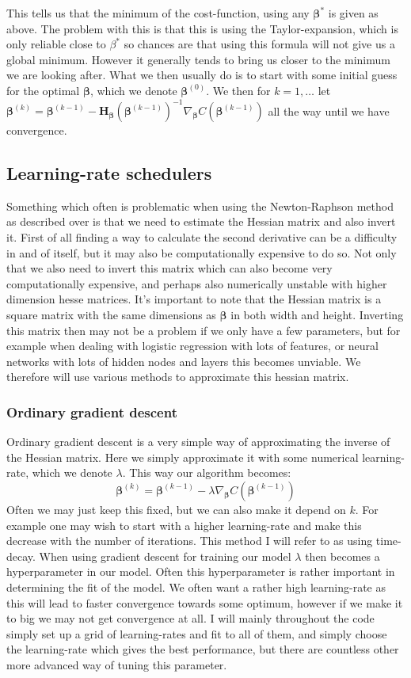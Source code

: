 \documentclass{article}
\begin{document}
This tells us that the minimum of the cost-function, using any $\bm{\beta}^*$ is
given as above. The problem with this is that this is using the
Taylor-expansion, which is only reliable close to $\beta^*$ so chances are that
using this formula will not give us a global minimum. However it generally tends
to bring us closer to the minimum we are looking after. What we then usually do
is to start with some initial guess for the optimal $\bm{\beta}$, which we
denote $\bm{\beta}^{(0)}$. We then for $k=1, \dots$ let $\bm{\beta}^{(k)} =
    \bm{\beta}^{(k-1)} - \bm{H}_{\bm{\beta}}(\bm{\beta}^{(k-1)})^{-1}
    \nabla_{\bm{\beta}} C(\bm{\beta}^{(k-1)})$ all the way until we have convergence.

\subsection{Learning-rate schedulers}
Something which often is problematic when using the Newton-Raphson method as
described over is that we need to estimate the Hessian matrix and also invert
it. First of all finding a way to calculate the second derivative can be a
difficulty in and of itself, but it may also be computationally expensive to do
so. Not only that we also need to invert this matrix which can also become very
computationally expensive, and perhaps also numerically unstable with higher
dimension hesse matrices. It's important to note that the Hessian matrix is a
square matrix with the same dimensions as $\bm{\beta}$ in both width and height.
Inverting this matrix then may not be a problem if we only have a few
parameters, but for example when dealing with logistic regression with lots of
features, or neural networks with lots of hidden nodes and layers this becomes
unviable. We therefore will use various methods to approximate this hessian matrix.

\subsubsection{Ordinary gradient descent}
Ordinary gradient descent is a very simple way of approximating the inverse of
the Hessian matrix. Here we simply approximate it with some numerical
learning-rate, which we denote $\lambda$. This way our algorithm becomes:
$$\bm{\beta}^(k) = \bm{\beta}^{(k-1)} - \lambda \nabla_{\bm{\beta}} C(\bm{\beta}^{(k-1)})$$
Often we may just keep this fixed, but we can also make it depend on $k$. For
example one may wish to start with a higher learning-rate and make this decrease
with the number of iterations. This method I will refer to as using time-decay.
When using gradient descent for training our model $\lambda$ then becomes a
hyperparameter in our model. Often this hyperparameter is rather important in
determining the fit of the model. We often want a rather high learning-rate as
this will lead to faster convergence towards some optimum, however if we make it
to big we may not get convergence at all. I will mainly throughout the code
simply set up a grid of learning-rates and fit to all of them, and simply choose
the learning-rate which gives the best performance, but there are countless
other more advanced way of tuning this parameter.
\end{document}
